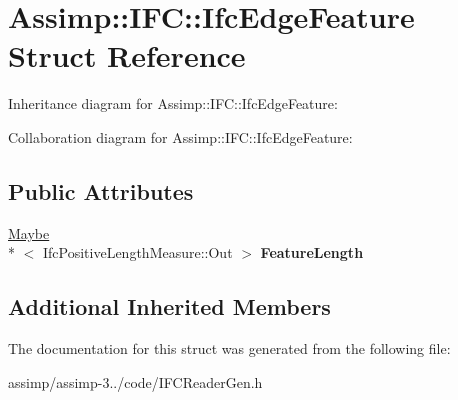 \hypertarget{struct_assimp_1_1_i_f_c_1_1_ifc_edge_feature}{\section{Assimp\+:\+:I\+F\+C\+:\+:Ifc\+Edge\+Feature Struct Reference}
\label{struct_assimp_1_1_i_f_c_1_1_ifc_edge_feature}
}


Inheritance diagram for Assimp\+:\+:I\+F\+C\+:\+:Ifc\+Edge\+Feature\+:


Collaboration diagram for Assimp\+:\+:I\+F\+C\+:\+:Ifc\+Edge\+Feature\+:
\subsection*{Public Attributes}
\begin{DoxyCompactItemize}
\item 
\hypertarget{struct_assimp_1_1_i_f_c_1_1_ifc_edge_feature_ae663a25c0e01b91f09dd8fcac614b161}{\hyperlink{struct_assimp_1_1_s_t_e_p_1_1_maybe}{Maybe}\\*
$<$ Ifc\+Positive\+Length\+Measure\+::\+Out $>$ {\bfseries Feature\+Length}}\label{struct_assimp_1_1_i_f_c_1_1_ifc_edge_feature_ae663a25c0e01b91f09dd8fcac614b161}

\end{DoxyCompactItemize}
\subsection*{Additional Inherited Members}


The documentation for this struct was generated from the following file\+:\begin{DoxyCompactItemize}
\item 
assimp/assimp-\/3../code/I\+F\+C\+Reader\+Gen.\+h\end{DoxyCompactItemize}
